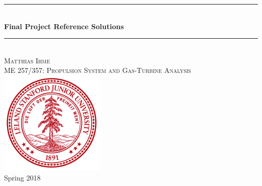 \documentclass[12pt]{article}
\begin{document}

\begin{titlepage}

\newcommand{\ddz}[1]{\frac{\mathrm{d} #1}{\mathrm{d} z}}
\newcommand{\HRule}{\rule{\linewidth}{0.5mm}} %

\center %
 

 




\HRule \\[1 cm]
{ \huge \bfseries Final Project Reference Solutions}\\[0.4cm] %
\HRule \\[2cm]
 

\Large  \textsc{Matthias Ihme}\\[2cm] %
\textsc{\large ME 257/357: Propulsion System and Gas-Turbine Analysis}\\[2cm] %

\includegraphics[width=50mm]{stanford_seal.png}\\[2cm] %
{\large Spring 2018}%


\end{titlepage}
\end{document}
